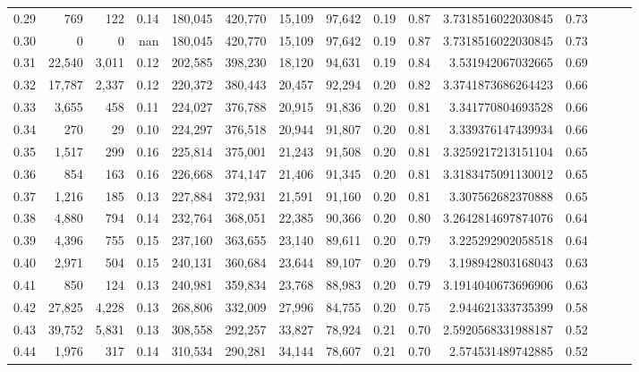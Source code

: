 \begin{tabular}{rrrrrrrrrrrrrrr}
0.29 &     769 &    122 &  0.14 &  180,045 &  420,770 &   15,109 &   97,642 &  0.19 &  0.87 &   3.7318516022030845 &      0.73 \\
0.30 &       0 &      0 &   nan &  180,045 &  420,770 &   15,109 &   97,642 &  0.19 &  0.87 &   3.7318516022030845 &      0.73 \\
0.31 &  22,540 &  3,011 &  0.12 &  202,585 &  398,230 &   18,120 &   94,631 &  0.19 &  0.84 &    3.531942067032665 &      0.69 \\
0.32 &  17,787 &  2,337 &  0.12 &  220,372 &  380,443 &   20,457 &   92,294 &  0.20 &  0.82 &   3.3741873686264423 &      0.66 \\
0.33 &   3,655 &    458 &  0.11 &  224,027 &  376,788 &   20,915 &   91,836 &  0.20 &  0.81 &    3.341770804693528 &      0.66 \\
0.34 &     270 &     29 &  0.10 &  224,297 &  376,518 &   20,944 &   91,807 &  0.20 &  0.81 &    3.339376147439934 &      0.66 \\
0.35 &   1,517 &    299 &  0.16 &  225,814 &  375,001 &   21,243 &   91,508 &  0.20 &  0.81 &   3.3259217213151104 &      0.65 \\
0.36 &     854 &    163 &  0.16 &  226,668 &  374,147 &   21,406 &   91,345 &  0.20 &  0.81 &   3.3183475091130012 &      0.65 \\
0.37 &   1,216 &    185 &  0.13 &  227,884 &  372,931 &   21,591 &   91,160 &  0.20 &  0.81 &    3.307562682370888 &      0.65 \\
0.38 &   4,880 &    794 &  0.14 &  232,764 &  368,051 &   22,385 &   90,366 &  0.20 &  0.80 &   3.2642814697874076 &      0.64 \\
0.39 &   4,396 &    755 &  0.15 &  237,160 &  363,655 &   23,140 &   89,611 &  0.20 &  0.79 &    3.225292902058518 &      0.64 \\
0.40 &   2,971 &    504 &  0.15 &  240,131 &  360,684 &   23,644 &   89,107 &  0.20 &  0.79 &    3.198942803168043 &      0.63 \\
0.41 &     850 &    124 &  0.13 &  240,981 &  359,834 &   23,768 &   88,983 &  0.20 &  0.79 &   3.1914040673696906 &      0.63 \\
0.42 &  27,825 &  4,228 &  0.13 &  268,806 &  332,009 &   27,996 &   84,755 &  0.20 &  0.75 &    2.944621333735399 &      0.58 \\
0.43 &  39,752 &  5,831 &  0.13 &  308,558 &  292,257 &   33,827 &   78,924 &  0.21 &  0.70 &   2.5920568331988187 &      0.52 \\
0.44 &   1,976 &    317 &  0.14 &  310,534 &  290,281 &   34,144 &   78,607 &  0.21 &  0.70 &    2.574531489742885 &      0.52 \\

\end{tabular}
